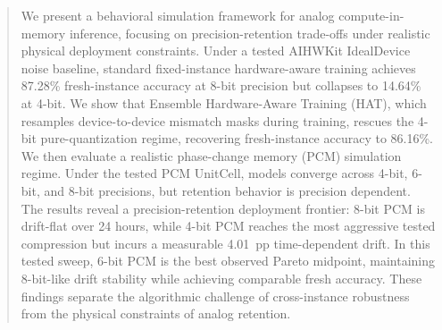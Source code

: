 \begin{abstract}
We present a behavioral simulation framework for analog compute-in-memory inference, focusing on precision-retention trade-offs under realistic physical deployment constraints. Under a tested AIHWKit IdealDevice noise baseline, standard fixed-instance hardware-aware training achieves 87.28\% fresh-instance accuracy at 8-bit precision but collapses to 14.64\% at 4-bit. We show that Ensemble Hardware-Aware Training (HAT), which resamples device-to-device mismatch masks during training, rescues the 4-bit pure-quantization regime, recovering fresh-instance accuracy to 86.16\%. We then evaluate a realistic phase-change memory (PCM) simulation regime. Under the tested PCM UnitCell, models converge across 4-bit, 6-bit, and 8-bit precisions, but retention behavior is precision dependent. The results reveal a precision-retention deployment frontier: 8-bit PCM is drift-flat over 24 hours, while 4-bit PCM reaches the most aggressive tested compression but incurs a measurable 4.01~pp time-dependent drift. In this tested sweep, 6-bit PCM is the best observed Pareto midpoint, maintaining 8-bit-like drift stability while achieving comparable fresh accuracy. These findings separate the algorithmic challenge of cross-instance robustness from the physical constraints of analog retention.
\end{abstract}
